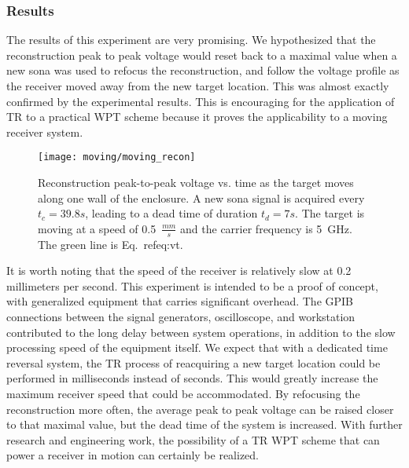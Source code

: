 \subsubsection{Results}
\label{moving-results}

The results of this experiment are very promising. We hypothesized that the reconstruction peak to peak voltage would reset back to a maximal value when a new sona was used to refocus the reconstruction, and follow the voltage profile as the receiver moved away from the new target location. This was almost exactly confirmed by the experimental results. This is encouraging for the application of TR to a practical WPT scheme because it proves the applicability to a moving receiver system.

\begin{figure}[t]
\centering
\texttt{[image: moving/moving\_recon]}
    \caption[Peak-to-peak voltage of moving reconstructions]{Reconstruction peak-to-peak voltage vs. time as the target moves along one wall of the enclosure. A new sona signal is acquired every $t_c = 39.8s$, leading to a dead time of duration $t_d = 7s$. The target is moving at a speed of 0.5~$\frac{mm}{s}$ and the carrier frequency is 5~GHz. The green line is Eq.~ref{eq:vt}.}
    \label{fig:moving-recon}
\end{figure}

It is worth noting that the speed of the receiver is relatively slow at 0.2 millimeters per second. This experiment is intended to be a proof of concept, with generalized equipment that carries significant overhead. The GPIB connections between the signal generators, oscilloscope, and workstation contributed to the long delay between system operations, in addition to the slow processing speed of the equipment itself. We expect that with a dedicated time reversal system, the TR process of reacquiring a new target location could be performed in milliseconds instead of seconds. This would greatly increase the maximum receiver speed that could be accommodated. By refocusing the reconstruction more often, the average peak to peak voltage can be raised closer to that maximal value, but the dead time of the system is increased. With further research and engineering work, the possibility of a TR WPT scheme that can power a receiver in motion can certainly be realized.
